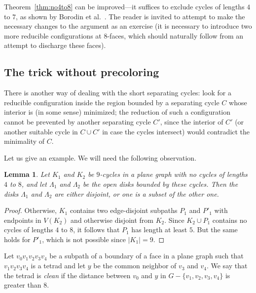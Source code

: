 \documentclass[12pt,twoside,openright,a4paper]{book}
\newtheorem{lemma}[theorem]{Lemma}
\begin{document}
Theorem~\ref{thm:no4to8} can be improved---it suffices to exclude cycles of lengths $4$ to $7$, as shown
by Borodin et al.~\cite{bor47}.  The reader is invited to attempt to make the necessary changes to the
argument as an exercise (it is necessary to introduce two more reducible configurations at $8$-faces,
which should naturally follow from an attempt to discharge these faces).

\subsection{The trick without precoloring}\label{ssec:shortestinter}

There is another way of dealing with the short separating cycles:
look for a reducible configuration inside the region bounded by a separating cycle $C$ whose
interior is (in some sense) minimized; the reduction of such a configuration cannot
be prevented by another separating cycle $C'$, since the interior of $C'$ (or another suitable
cycle in $C\cup C'$ in case the cycles intersect) would contradict the minimality of $C$.

Let us give an example.  We will need the following observation.

\begin{lemma}\label{lemma:no4to8-laminar9}
Let $K_1$ and $K_2$ be $9$-cycles in a plane graph with no cycles of lengths $4$ to $8$,
and let $\Lambda_1$ and $\Lambda_2$ be the open disks bounded by these cycles.  Then the
disks $\Lambda_1$ and $\Lambda_2$ are either disjoint, or one is a subset of the other one.
\end{lemma}
\begin{proof}
Otherwise, $K_1$ contains two edge-disjoint subpaths $P_1$ and $P'_1$ with endpoints in $V(K_2)$
and otherwise disjoint from $K_2$.  Since $K_2\cup P_1$ contains no cycles of lengths $4$ to $8$,
it follows that $P_1$ has length at least $5$.  But the same holds for $P'_1$, which is not possible
since $|K_1|=9$.
\end{proof}

Let $v_0v_1v_2v_3v_4$ be a subpath of a boundary of a face in a plane
graph such that $v_1v_2v_3v_4$ is a tetrad and let $y$ be the common neighbor of $v_3$ and $v_4$.
We say that the tetrad is \emph{clean} if the distance between $v_0$ and $y$ in $G-\{v_1,v_2,v_3,v_4\}$
is greater than $8$.
\end{document}
